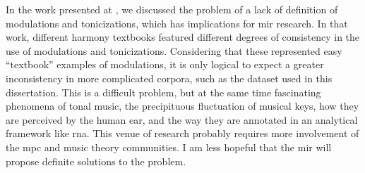 
In the work presented at \textcite{napoleslopez2020local},
we discussed the problem of a lack of definition of
modulations and tonicizations, which has implications for
\gls{mir} research. In that work, different harmony
textbooks featured different degrees of consistency in the
use of modulations and tonicizations. Considering that these
represented  easy ``textbook'' examples of modulations, it
is only logical to expect a greater inconsistency in more
complicated corpora, such as the dataset used in this
dissertation. This is a difficult problem, but at the same
time fascinating phenomena of tonal music, the precipituous
fluctuation of musical keys, how they are perceived by the
human ear, and the way they are annotated in an analytical
framework like \gls{rna}. This venue of research probably
requires more involvement of the \gls{mpc} and music theory
communities. I am less hopeful that the \gls{mir} will
propose definite solutions to the problem.
